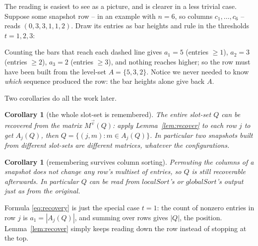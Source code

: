 \documentclass{article}
\newtheorem{corollary}[theorem]{Corollary}
\begin{document}
The reading is easiest to see as a picture, and is clearer in a less trivial case.
Suppose some snapshot row -- in an example with $n=6$, so columns
$c_1,\ldots,c_6$ -- reads $(0,3,3,1,1,2)$.  Draw its entries as bar heights and rule
in the thresholds $t=1,2,3$:
\begin{center}
\end{center}
Counting the bars that reach each dashed line gives $a_1=5$ (entries $\ge1$),
$a_2=3$ (entries $\ge2$), $a_3=2$ (entries $\ge3$), and nothing reaches higher; so
the row must have been built from the level-set $A=\{5,3,2\}$.  Notice we never
needed to know \emph{which} sequence produced the row: the bar heights alone give
back $A$.

Two corollaries do all the work later.

\begin{corollary}[the whole slot-set is remembered]\label{cor:wholeQ}
The entire slot-set $Q$ can be recovered from the matrix $M^{\vec v}(Q)$: apply
Lemma~\ref{lem:recover} to each row $j$ to get $A_j(Q)$, then
$Q=\{(j,m):m\in A_j(Q)\}$.  In particular two snapshots built from
\emph{different} slot-sets are different matrices, whatever the configurations.
\end{corollary}

\begin{corollary}[remembering survives column sorting]\label{cor:survives}
Permuting the columns of a snapshot does not change any row's multiset of entries,
so $Q$ is still recoverable afterwards.  In particular
$Q$ can be read from $localSort$'s or $globalSort$'s output just as from the
original.
\end{corollary}

\noindent Formula \eqref{eq:recovery} is just the special case $t=1$: the count of
nonzero entries in row $j$ is $a_1=|A_j(Q)|$, and summing over rows gives
$|Q|$, the position.  Lemma~\ref{lem:recover} simply keeps reading down the row
instead of stopping at the top.
\end{document}
